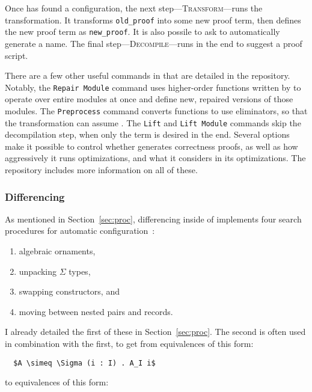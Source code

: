 Once \toolnamec has found a configuration, the next step---\textsc{Transform}---runs the transformation.
It transforms \lstinline{old_proof} into some new proof term, then defines the new proof term as \lstinline{new_proof}.
It is also possile to ask \toolnamec to automatically generate a name. %
The final step---\textsc{Decompile}---runs in the end to suggest a proof script.

There are a few other useful commands in \toolnamec that are detailed in the repository.
Notably, the \lstinline{Repair Module} command uses higher-order functions written by 
to operate over entire modules at once and define new, repaired versions of those modules.
The \lstinline{Preprocess} command converts functions to use eliminators, so that the transformation
can assume .
The \lstinline{Lift} and \lstinline{Lift Module} commands skip the decompilation step,
when only the term is desired in the end.
Several options make it possible to control whether \toolnamec generates correctness proofs,
as well as how aggressively it runs optimizations, and what it considers in its optimizations.
The repository includes more information on all of these.

\subsubsection{Differencing}
\label{sec:pi-details-diff}

As mentioned in Section~\ref{sec:proc}, differencing inside of
\toolnamec implements four search procedures for automatic configuration~\href{https://github.com/uwplse/pumpkin-pi/blob/v2.0.0/plugin/src/automation/lift/liftconfig.ml}{}:

\begin{enumerate}
\item algebraic ornaments,
\item unpacking $\Sigma$ types,
\item swapping constructors, and
\item moving between nested pairs and records.
\end{enumerate}
I already detailed the first of these in Section~\ref{sec:proc}.
The second is often used in combination with the first, to get from equivalences of this form:

\begin{lstlisting}
  $A \simeq \Sigma (i : I) . A_I i$
\end{lstlisting}
to equivalences of this form:

